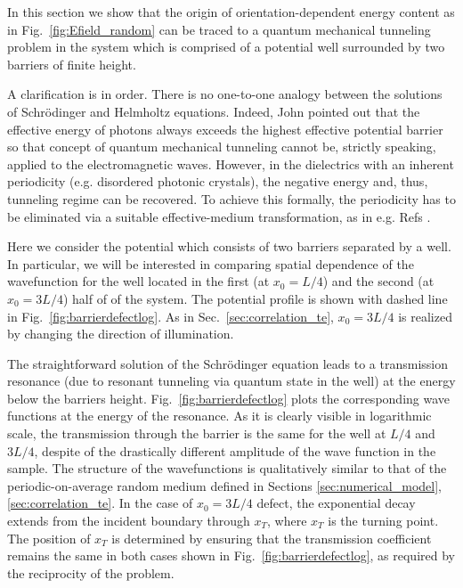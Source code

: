 In this section we show that the origin of orientation-dependent energy content as in Fig.~\ref{fig:Efield_random} can be traced to a quantum mechanical tunneling problem in the system which is comprised of a potential well surrounded by two barriers of finite height. 

A clarification is in order. There is no one-to-one analogy between the solutions of Schr\"{o}dinger and Helmholtz equations\cite{2004_dragoman_book}. Indeed, John \cite{1991_John} pointed out that the effective energy of photons always exceeds the highest effective potential barrier so that concept of quantum mechanical tunneling cannot be, strictly speaking, applied to the electromagnetic waves. However, in the dielectrics with an inherent periodicity\cite{1987_John} (e.g. disordered photonic crystals), the negative energy and, thus, tunneling regime can be recovered. To achieve this formally, the periodicity has to be eliminated via a suitable effective-medium transformation, as in e.g. Refs \cite{1994_Sipe,2004_Bliokh_wavelet,2008_Yamilov_JoSAB}. 

Here we consider the potential which consists of two barriers separated by a well. In particular, we will be interested in comparing spatial dependence of the wavefunction for the well located in the first (at $x_0=L/4$) and the second (at $x_0=3L/4$) half of of the system. The potential profile is shown with dashed line in Fig.~\ref{fig:barrierdefectlog}. As in Sec.~\ref{sec:correlation_te}, $x_0=3L/4$ is realized by changing the direction of illumination.

The straightforward solution of the Schr\"{o}dinger equation leads to a transmission resonance (due to resonant tunneling via quantum state in the well) at the energy below the barriers height. Fig.~\ref{fig:barrierdefectlog} plots the corresponding wave functions at the energy of the resonance. As it is clearly visible in logarithmic scale, the transmission through the barrier is the same for the well at $L/4$ and $3L/4$, despite of the drastically different amplitude of the wave function in the sample. The structure of the wavefunctions is qualitatively similar to that of the periodic-on-average random medium defined in Sections \ref{sec:numerical_model},\ref{sec:correlation_te}. In the case of $x_0=3L/4$ defect, the exponential decay extends from the incident boundary through $x_T$, where $x_T$ is the turning point. The position of $x_T$ is determined by ensuring that the transmission coefficient remains the same in both cases shown in Fig.~\ref{fig:barrierdefectlog}, as required by the reciprocity of the problem.

